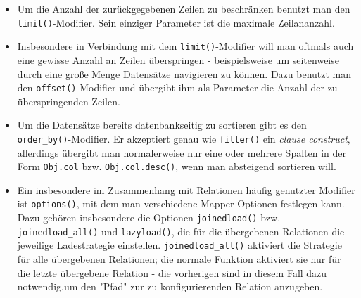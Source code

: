 \begin{itemize}
Eine Alternative zu \texttt{\&} und \texttt{|} sind die Funktionen
\texttt{and\_()} und \texttt{or\_()}. Sie verknüpfen alle ihre Parameter mit
\texttt{AND} bzw. \texttt{OR}. Da man seine Ausdrücke dadurch allerdings in
Polnischer Notation\footnote{Schreibweise für Ausdrücke, in der die Operanden
nach dem Operator kommen.} schreibt, senkt diese Variante die Lesbarkeit des
Codes. Daher ist es im Allgemeinen sinnvoller die überladenen Operatoren zu
benutzen und sauber zu klammern.

Wenn die Filter auf der obersten Ebene nur aus Konjunktionen bestehen, kann man
sie auch einfach auf mehrere \texttt{filter()}-Aufrufe verteilen - wie schon bei
\texttt{filter\_by{}} werden die neuen Filter mit den alten per \texttt{AND}
verknüpft.

Neben Vergleichen sind auch andere Operatoren möglich. Der vermutlich Wichtigste
ist dabei der \texttt{IN}-Operator, mit dem man überprüft, ob eine Spalte einen
Wert aus einer Liste von Werten hat. Da man in Python den \texttt{in}-Operator
nicht überladen kann, ist er durch die Methode \texttt{Obj.col.in\_(lst)}
realisiert, wobei \texttt{lst} die Liste der Werte ist.
Wenn man einen Operator benutzen will, den SQLAlchemy nicht kennt, kann man ihn
mit der \texttt{Obj.col.op(oper)(arg)}-Methode aufrufen, wobei \texttt{oper} der
Operator und \texttt{arg} der rechte Operand ist.


\item Um die Anzahl der zurückgegebenen Zeilen zu beschränken benutzt man den
\texttt{limit()}-Modifier. Sein einziger Parameter ist die maximale
Zeilananzahl.


\item Insbesondere in Verbindung mit dem \texttt{limit()}-Modifier will man
oftmals auch eine gewisse Anzahl an Zeilen überspringen - beispielsweise um
seitenweise durch eine große Menge Datensätze navigieren zu können. Dazu benutzt
man den \texttt{offset()}-Modifier und übergibt ihm als Parameter die Anzahl der
zu überspringenden Zeilen.


\item Um die Datensätze bereits datenbankseitig zu sortieren gibt es den
\texttt{order\_by()}-Modifier. Er akzeptiert genau wie \texttt{filter()} ein
\emph{clause construct}, allerdings übergibt man normalerweise nur eine oder
mehrere Spalten in der Form \texttt{Obj.col} bzw. \texttt{Obj.col.desc()},
wenn man absteigend sortieren will.


\item Ein insbesondere im Zusammenhang mit Relationen häufig genutzter Modifier
ist \texttt{options()}, mit dem man verschiedene Mapper-Optionen festlegen kann.
Dazu gehören insbesondere die Optionen \texttt{joinedload()} bzw.
\texttt{joinedload\_all()} und \texttt{lazyload()}, die für die übergebenen
Relationen die jeweilige Ladestrategie einstellen. \texttt{joinedload\_all()}
aktiviert die Strategie für alle übergebenen Relationen; die normale Funktion
aktiviert sie nur für die letzte übergebene Relation - die vorherigen sind in
diesem Fall dazu notwendig,um den "Pfad" zur zu konfigurierenden Relation anzugeben.


\end{itemize}
